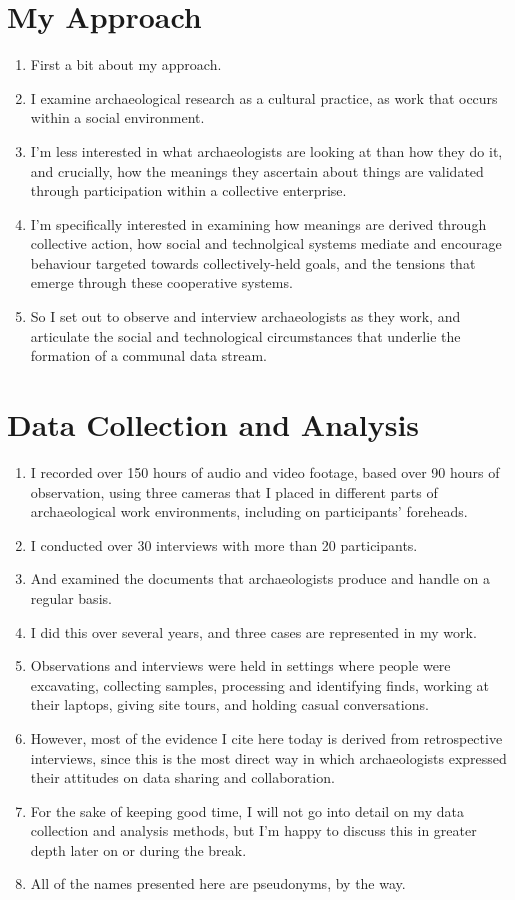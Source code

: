 \documentclass[12pt]{article}
\begin{document}
\section{My Approach}
\begin{enumerate}
  \item First a bit about my approach.
  \item I examine archaeological research as a cultural practice, as work that occurs within a social environment.
  \item I'm less interested in what archaeologists are looking at than how they do it, and crucially, how the meanings they ascertain about things are validated through participation within a collective enterprise.
  \item I'm specifically interested in examining how meanings are derived through collective action, how social and technolgical systems mediate and encourage behaviour targeted towards collectively-held goals, and the tensions that emerge through these cooperative systems.
  \item So I set out to observe and interview archaeologists as they work, and articulate the social and technological circumstances that underlie the formation of a communal data stream.
\end{enumerate}

\section{Data Collection and Analysis}
\begin{enumerate}
  \item I recorded over 150 hours of audio and video footage, based over 90 hours of observation, using three cameras that I placed in different parts of archaeological work environments, including on participants' foreheads.
  \item I conducted over 30 interviews with more than 20 participants.
  \item And examined the documents that archaeologists produce and handle on a regular basis.
  \item I did this over several years, and three cases are represented in my work.
  \item Observations and interviews were held in settings where people were excavating, collecting samples, processing and identifying finds, working at their laptops, giving site tours, and holding casual conversations.
  \item However, most of the evidence I cite here today is derived from retrospective interviews, since this is the most direct way in which archaeologists expressed their attitudes on data sharing and collaboration.
  \item For the sake of keeping good time, I will not go into detail on my data collection and analysis methods, but I'm happy to discuss this in greater depth later on or during the break.
  \item All of the names presented here are pseudonyms, by the way.
\end{enumerate}
\end{document}

